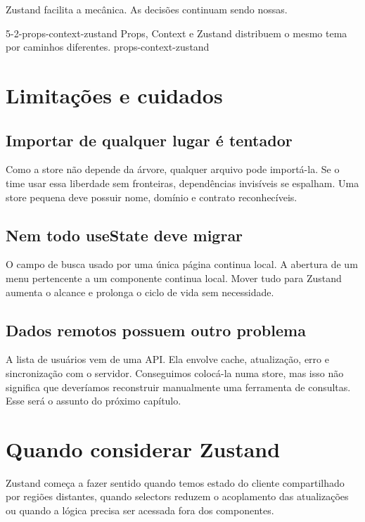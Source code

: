 Zustand facilita a mecânica. As decisões continuam sendo nossas.

\imagemcapitulo
  {5-2-props-context-zustand}
  {Props, Context e Zustand distribuem o mesmo tema por caminhos diferentes.}
  {props-context-zustand}

\section{Limitações e cuidados}

\subsection{Importar de qualquer lugar é tentador}

Como a store não depende da árvore, qualquer arquivo pode importá-la. Se o time
usar essa liberdade sem fronteiras, dependências invisíveis se espalham. Uma
store pequena deve possuir nome, domínio e contrato reconhecíveis.

\subsection{Nem todo useState deve migrar}

O campo de busca usado por uma única página continua local. A abertura de um
menu pertencente a um componente continua local. Mover tudo para Zustand aumenta
o alcance e prolonga o ciclo de vida sem necessidade.

\subsection{Dados remotos possuem outro problema}

A lista de usuários vem de uma API. Ela envolve cache, atualização, erro e
sincronização com o servidor. Conseguimos colocá-la numa store, mas isso não
significa que deveríamos reconstruir manualmente uma ferramenta de consultas.
Esse será o assunto do próximo capítulo.

\section{Quando considerar Zustand}

Zustand começa a fazer sentido quando temos estado do cliente compartilhado por
regiões distantes, quando selectors reduzem o acoplamento das atualizações ou
quando a lógica precisa ser acessada fora dos componentes.

